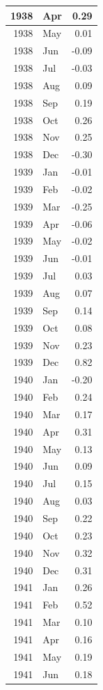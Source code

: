 \documentclass[
]{article}
\begin{document}
\begin{table}[H]
\begin{tabular}[t]{r|l|r}
\hline
1938 & Apr & 0.29\\
\hline
1938 & May & 0.01\\
\hline
1938 & Jun & -0.09\\
\hline
1938 & Jul & -0.03\\
\hline
1938 & Aug & 0.09\\
\hline
1938 & Sep & 0.19\\
\hline
1938 & Oct & 0.26\\
\hline
1938 & Nov & 0.25\\
\hline
1938 & Dec & -0.30\\
\hline
1939 & Jan & -0.01\\
\hline
1939 & Feb & -0.02\\
\hline
1939 & Mar & -0.25\\
\hline
1939 & Apr & -0.06\\
\hline
1939 & May & -0.02\\
\hline
1939 & Jun & -0.01\\
\hline
1939 & Jul & 0.03\\
\hline
1939 & Aug & 0.07\\
\hline
1939 & Sep & 0.14\\
\hline
1939 & Oct & 0.08\\
\hline
1939 & Nov & 0.23\\
\hline
1939 & Dec & 0.82\\
\hline
1940 & Jan & -0.20\\
\hline
1940 & Feb & 0.24\\
\hline
1940 & Mar & 0.17\\
\hline
1940 & Apr & 0.31\\
\hline
1940 & May & 0.13\\
\hline
1940 & Jun & 0.09\\
\hline
1940 & Jul & 0.15\\
\hline
1940 & Aug & 0.03\\
\hline
1940 & Sep & 0.22\\
\hline
1940 & Oct & 0.23\\
\hline
1940 & Nov & 0.32\\
\hline
1940 & Dec & 0.31\\
\hline
1941 & Jan & 0.26\\
\hline
1941 & Feb & 0.52\\
\hline
1941 & Mar & 0.10\\
\hline
1941 & Apr & 0.16\\
\hline
1941 & May & 0.19\\
\hline
1941 & Jun & 0.18\\

\end{tabular}
\end{table}
\end{document}
